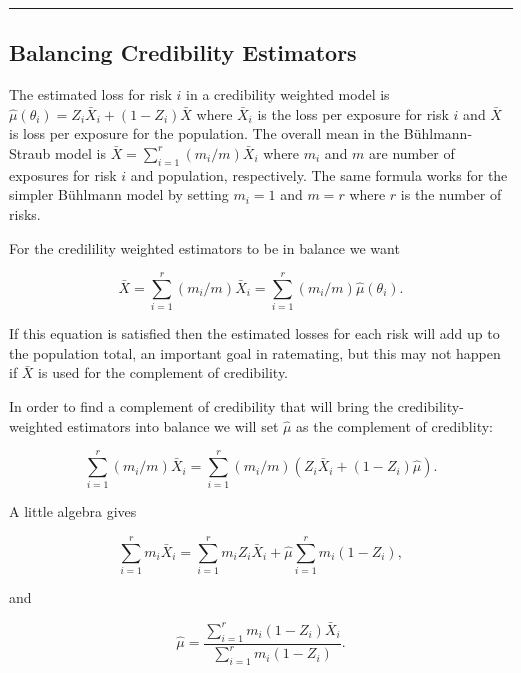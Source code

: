 \documentclass[]{book}
\theoremstyle{definition}
\theoremstyle{definition}
\theoremstyle{definition}
\theoremstyle{remark}
\begin{document}
\begin{center}\rule{0.5\linewidth}{\linethickness}\end{center}

\subsection{Balancing Credibility
Estimators}\label{balancing-credibility-estimators}

The estimated loss for risk \(i\) in a credibility weighted model is
\(\hat{\mu}(\theta_i)=Z_i\bar{X}_i+(1-Z_i)\bar{X}\) where \(\bar{X}_i\)
is the loss per exposure for risk \(i\) and \(\bar{X}\) is loss per
exposure for the population. The overall mean in the Bühlmann-Straub
model is \(\bar{X}=\sum_{i=1}^r(m_i/m) \bar{X}_i\) where \(m_i\) and
\(m\) are number of exposures for risk \(i\) and population,
respectively. The same formula works for the simpler Bühlmann model by
setting \(m_i=1\) and \(m=r\) where \(r\) is the number of risks.

For the credilility weighted estimators to be in balance we want

\begin{equation*}   
\bar{X}=\sum_{i=1}^r(m_i/m) \bar{X}_i=\sum_{i=1}^r(m_i/m) \hat{\mu}(\theta_i).
\end{equation*}

If this equation is satisfied then the estimated losses for each risk
will add up to the population total, an important goal in ratemating,
but this may not happen if \(\bar{X}\) is used for the complement of
credibility.

In order to find a complement of credibility that will bring the
credibility-weighted estimators into balance we will set \(\hat{\mu}\)
as the complement of crediblity:

\begin{equation*}   
\sum_{i=1}^r(m_i/m) \bar{X}_i=\sum_{i=1}^r(m_i/m) (Z_i\bar{X}_i+(1-Z_i)\hat{\mu}) .
\end{equation*}

A little algebra gives

\begin{equation*}   
\sum_{i=1}^r m_i \bar{X}_i=\sum_{i=1}^r m_i Z_i\bar{X}_i + \hat{\mu}\sum_{i=1}^r m_i(1-Z_i),
\end{equation*}

and

\begin{equation*}  
\hat{\mu}=\frac{\sum_{i=1}^r m_i(1-Z_i)\bar{X}_i}{\sum_{i=1}^r m_i(1-Z_i)}. \end{equation*}
\end{document}
